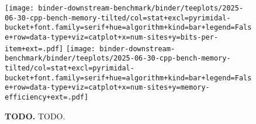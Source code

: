 \begin{figure}

\texttt{[image: binder-downstream-benchmark/binder/teeplots/2025-06-30-cpp-bench-memory-tilted/col=stat+excl=pyrimidal-bucket+font.family=serif+hue=algorithm+kind=bar+legend=False+row=data-type+viz=catplot+x=num-sites+y=bits-per-item+ext=.pdf]}%
\texttt{[image: binder-downstream-benchmark/binder/teeplots/2025-06-30-cpp-bench-memory-tilted/col=stat+excl=pyrimidal-bucket+font.family=serif+hue=algorithm+kind=bar+legend=False+row=data-type+viz=catplot+x=num-sites+y=memory-efficiency+ext=.pdf]}

\vspace{-2ex}

\caption{%
\textbf{TODO.}
\small
TODO.
}
\label{fig:memory}
\end{figure}
